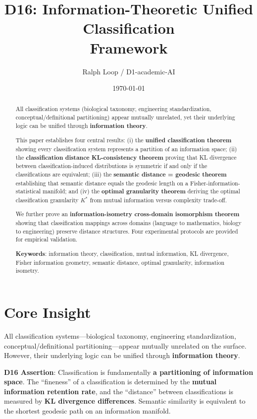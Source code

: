 \documentclass[12pt, a4paper]{article}
\title{\textbf{D16: Information-Theoretic Unified Classification\\Framework}}
\author{Ralph Loop / D1-academic-AI}
\date{\today}
\begin{document}
\maketitle

\begin{abstract}
All classification systems (biological taxonomy, engineering standardization, conceptual/definitional partitioning) appear mutually unrelated, yet their underlying logic can be unified through \textbf{information theory}.

This paper establishes four central results: (i) the \textbf{unified classification theorem} showing every classification system represents a partition of an information space; (ii) the \textbf{classification distance KL-consistency theorem} proving that KL divergence between classification-induced distributions is symmetric if and only if the classifications are equivalent; (iii) the \textbf{semantic distance = geodesic theorem} establishing that semantic distance equals the geodesic length on a Fisher-information-statistical manifold; and (iv) the \textbf{optimal granularity theorem} deriving the optimal classification granularity $K^*$ from mutual information versus complexity trade-off.

We further prove an \textbf{information-isometry cross-domain isomorphism theorem} showing that classification mappings across domains (language to mathematics, biology to engineering) preserve distance structures. Four experimental protocols are provided for empirical validation.

\textbf{Keywords}: information theory, classification, mutual information, KL divergence, Fisher information geometry, semantic distance, optimal granularity, information isometry.
\end{abstract}

\tableofcontents
\newpage

\section{Core Insight}\label{sec:core}

All classification systems---biological taxonomy, engineering standardization, conceptual/definitional partitioning---appear mutually unrelated on the surface. However, their underlying logic can be unified through \textbf{information theory}.

\textbf{D16 Assertion}: Classification is fundamentally \textbf{a partitioning of information space}. The ``fineness'' of a classification is determined by the \textbf{mutual information retention rate}, and the ``distance'' between classifications is measured by \textbf{KL divergence differences}. Semantic similarity is equivalent to the shortest geodesic path on an information manifold.
\end{document}
